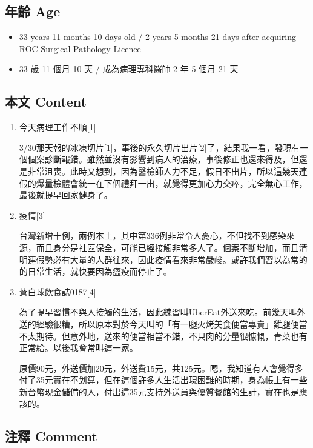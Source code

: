\documentclass[a5paper, 11pt
]{book}
\providecommand{\tightlist}{%
  \setlength{\itemsep}{0pt}\setlength{\parskip}{0pt}}
\begin{document}
\hypertarget{ux5e74ux9f61-age-32}{%
\subsection{年齡 Age}\label{ux5e74ux9f61-age-32}}

\begin{itemize}
\tightlist
\item
  33 years 11 months 10 days old / 2 years 5 months 21 days after
  acquiring ROC Surgical Pathology Licence
\item
  33 歲 11 個月 10 天 / 成為病理專科醫師 2 年 5 個月 21 天
\end{itemize}

\hypertarget{ux672cux6587-content-32}{%
\subsection{本文 Content}\label{ux672cux6587-content-32}}

\begin{enumerate}
\def\labelenumi{\arabic{enumi}.}
\item
  今天病理工作不順{[}1{]}

  3/30那天報的冰凍切片{[}1{]}，事後的永久切片出片{[}2{]}了，結果我一看，發現有一個個案診斷報錯。雖然並沒有影響到病人的治療，事後修正也還來得及，但還是非常沮喪。此時又想到，因為醫檢師人力不足，假日不出片，所以這幾天連假的爆量檢體會統一在下個禮拜一出，就覺得更加心力交瘁，完全無心工作，最後就提早回家健身了。
\item
  疫情{[}3{]}

  台灣新增十例，兩例本土，其中第336例非常令人憂心，不但找不到感染來源，而且身分是社區保全，可能已經接觸非常多人了。個案不斷增加，而且清明連假勢必有大量的人群往來，因此疫情看來非常嚴峻。或許我們習以為常的的日常生活，就快要因為瘟疫而停止了。
\item
  蒼白球飲食誌0187{[}4{]}

  為了提早習慣不與人接觸的生活，因此練習叫UberEat外送來吃。前幾天叫外送的經驗很糟，所以原本對於今天叫的「有一腿火烤美食便當專賣」雞腿便當不太期待。但意外地，送來的便當相當不錯，不只肉的分量很慷慨，青菜也有正常給。以後我會常叫這一家。

  原價90元，外送價加20元，外送費15元，共125元。嗯，我知道有人會覺得多付了35元實在不划算，但在這個許多人生活出現困難的時期，身為帳上有一些新台幣現金儲備的人，付出這35元支持外送員與優質餐館的生計，實在也是應該的。
\end{enumerate}

\hypertarget{ux6ce8ux91cb-comment-32}{%
\subsection{注釋 Comment}\label{ux6ce8ux91cb-comment-32}}
\end{document}
